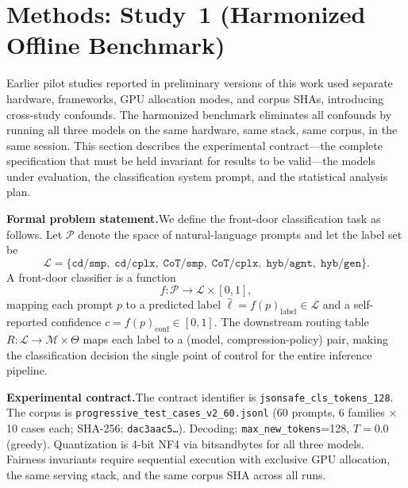 \documentclass{article}
\begin{document}
\section{Methods: Study~1 (Harmonized Offline Benchmark)}
\label{sec:methods1}

Earlier pilot studies reported in preliminary versions of this work used separate hardware, frameworks, GPU allocation modes, and corpus SHAs, introducing cross-study confounds. The harmonized benchmark eliminates all confounds by running all three models on the same hardware, same stack, same corpus, in the same session. This section describes the experimental contract---the complete specification that must be held invariant for results to be valid---the models under evaluation, the classification system prompt, and the statistical analysis plan.

\textbf{Formal problem statement.}\quad We define the front-door classification task as follows. Let $\mathcal{P}$ denote the space of natural-language prompts and let the label set be
\[
  \mathcal{L} = \{\texttt{cd/smp},\;\texttt{cd/cplx},\;\texttt{CoT/smp},\;\texttt{CoT/cplx},\;\texttt{hyb/agnt},\;\texttt{hyb/gen}\}.
\]
A front-door classifier is a function
\begin{equation}
  f: \mathcal{P} \longrightarrow \mathcal{L} \times [0,1],
  \label{eq:classifier}
\end{equation}
mapping each prompt $p$ to a predicted label $\hat{\ell} = f(p)_{\text{label}} \in \mathcal{L}$ and a self-reported confidence $c = f(p)_{\text{conf}} \in [0,1]$. The downstream routing table $R: \mathcal{L} \to \mathcal{M} \times \Theta$ maps each label to a (model, compression-policy) pair, making the classification decision the single point of control for the entire inference pipeline.

\textbf{Experimental contract.}\quad The contract identifier is \texttt{jsonsafe\_cls\_tokens\_128}. The corpus is \texttt{progressive\_test\_\allowbreak{}cases\_v2\_60.jsonl} (60 prompts, 6 families $\times$ 10 cases each; SHA-256: \texttt{dac3aac5\ldots}). Decoding: \texttt{max\_new\_tokens}=128, $T = 0.0$ (greedy). Quantization is 4-bit NF4 via bitsandbytes for all three models. Fairness invariants require sequential execution with exclusive GPU allocation, the same serving stack, and the same corpus SHA across all runs.
\end{document}
